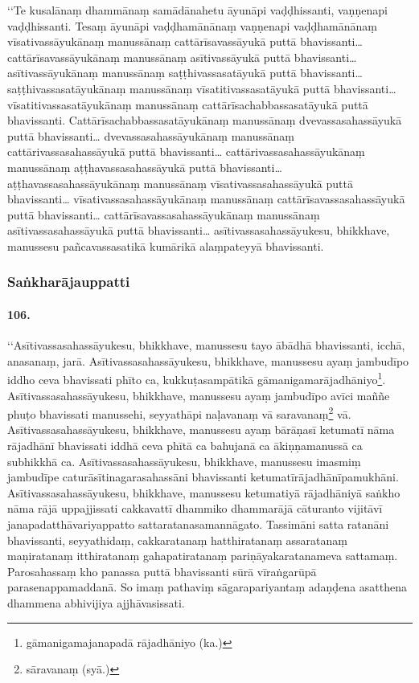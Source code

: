 ‘‘Te kusalānaṃ dhammānaṃ samādānahetu āyunāpi vaḍḍhissanti, vaṇṇenapi vaḍḍhissanti. Tesaṃ āyunāpi vaḍḍhamānānaṃ vaṇṇenapi vaḍḍhamānānaṃ vīsativassāyukānaṃ manussānaṃ cattārīsavassāyukā puttā bhavissanti… cattārīsavassāyukānaṃ manussānaṃ asītivassāyukā puttā bhavissanti… asītivassāyukānaṃ manussānaṃ saṭṭhivassasatāyukā puttā bhavissanti… saṭṭhivassasatāyukānaṃ manussānaṃ vīsatitivassasatāyukā puttā bhavissanti… vīsatitivassasatāyukānaṃ manussānaṃ cattārīsachabbassasatāyukā puttā bhavissanti. Cattārīsachabbassasatāyukānaṃ manussānaṃ dvevassasahassāyukā puttā bhavissanti… dvevassasahassāyukānaṃ manussānaṃ cattārivassasahassāyukā puttā bhavissanti… cattārivassasahassāyukānaṃ manussānaṃ aṭṭhavassasahassāyukā puttā bhavissanti… aṭṭhavassasahassāyukānaṃ manussānaṃ vīsativassasahassāyukā puttā bhavissanti… vīsativassasahassāyukānaṃ manussānaṃ cattārīsavassasahassāyukā puttā bhavissanti… cattārīsavassasahassāyukānaṃ manussānaṃ asītivassasahassāyukā puttā bhavissanti… asītivassasahassāyukesu, bhikkhave, manussesu pañcavassasatikā kumārikā alaṃpateyyā bhavissanti.

\subsubsection{Saṅkharājauppatti}

\paragraph{106.} ‘‘Asītivassasahassāyukesu, bhikkhave, manussesu tayo ābādhā bhavissanti, icchā, anasanaṃ, jarā. Asītivassasahassāyukesu, bhikkhave, manussesu ayaṃ jambudīpo iddho ceva bhavissati phīto ca, kukkuṭasampātikā gāmanigamarājadhāniyo\footnote{gāmanigamajanapadā rājadhāniyo (ka.)}. Asītivassasahassāyukesu, bhikkhave, manussesu ayaṃ jambudīpo avīci maññe phuṭo bhavissati manussehi, seyyathāpi naḷavanaṃ vā saravanaṃ\footnote{sāravanaṃ (syā.)} vā. Asītivassasahassāyukesu, bhikkhave, manussesu ayaṃ bārāṇasī ketumatī nāma rājadhānī bhavissati iddhā ceva phītā ca bahujanā ca ākiṇṇamanussā ca subhikkhā ca. Asītivassasahassāyukesu, bhikkhave, manussesu imasmiṃ jambudīpe caturāsītinagarasahassāni bhavissanti ketumatīrājadhānīpamukhāni. Asītivassasahassāyukesu, bhikkhave, manussesu ketumatiyā rājadhāniyā saṅkho nāma rājā uppajjissati cakkavattī dhammiko dhammarājā cāturanto vijitāvī janapadatthāvariyappatto sattaratanasamannāgato. Tassimāni satta ratanāni bhavissanti, seyyathidaṃ, cakkaratanaṃ hatthiratanaṃ assaratanaṃ maṇiratanaṃ itthiratanaṃ gahapatiratanaṃ pariṇāyakaratanameva sattamaṃ. Parosahassaṃ kho panassa puttā bhavissanti sūrā vīraṅgarūpā parasenappamaddanā. So imaṃ pathaviṃ sāgarapariyantaṃ adaṇḍena asatthena dhammena abhivijiya ajjhāvasissati.

